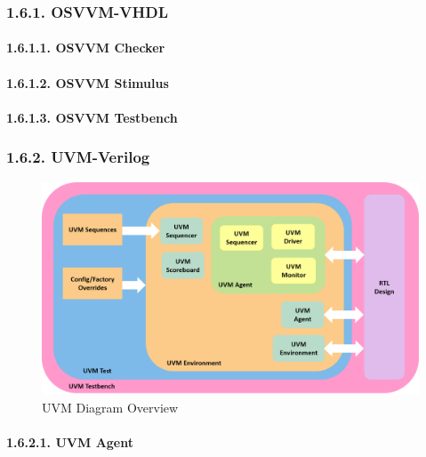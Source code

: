 \documentclass[
]{article}
\begin{document}
\hypertarget{osvvm-vhdl}{%
\subsubsection{1.6.1. OSVVM-VHDL}\label{osvvm-vhdl}}

\hypertarget{osvvm-checker}{%
\paragraph{1.6.1.1. OSVVM Checker}\label{osvvm-checker}}

\hypertarget{osvvm-stimulus}{%
\paragraph{1.6.1.2. OSVVM Stimulus}\label{osvvm-stimulus}}

\hypertarget{osvvm-testbench}{%
\paragraph{1.6.1.3. OSVVM Testbench}\label{osvvm-testbench}}

\hypertarget{uvm-verilog}{%
\subsubsection{1.6.2. UVM-Verilog}\label{uvm-verilog}}

\begin{figure}
\centering
\includegraphics{../bench/uvm-testbench.png}
\caption{UVM Diagram Overview}
\end{figure}

\hypertarget{uvm-agent}{%
\paragraph{1.6.2.1. UVM Agent}\label{uvm-agent}}
\end{document}
